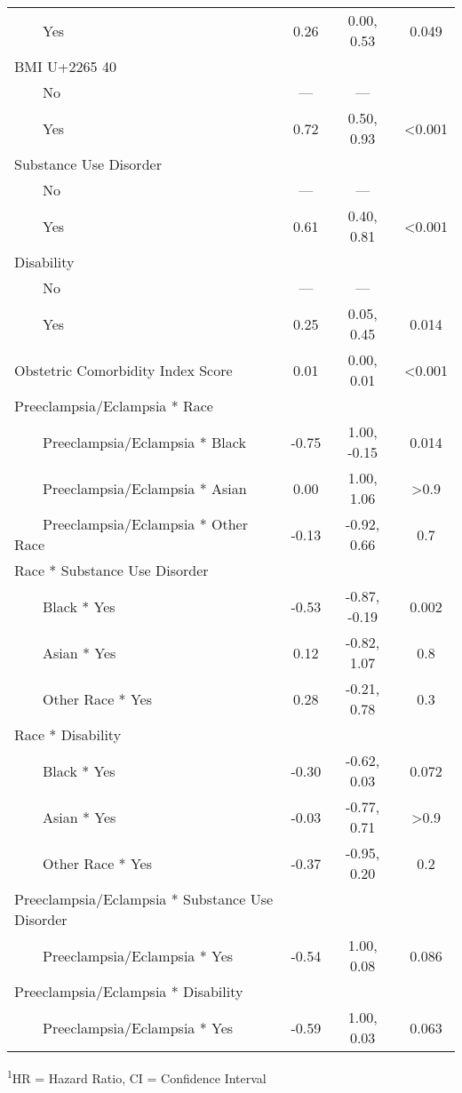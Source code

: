 \begin{longtable}{lccc}
    Yes & 0.26 & 0.00, 0.53 & 0.049 \\ 
BMI U+2265 40 &  &  &  \\ 
    No & — & — &  \\ 
    Yes & 0.72 & 0.50, 0.93 & <0.001 \\ 
Substance Use Disorder &  &  &  \\ 
    No & — & — &  \\ 
    Yes & 0.61 & 0.40, 0.81 & <0.001 \\ 
Disability &  &  &  \\ 
    No & — & — &  \\ 
    Yes & 0.25 & 0.05, 0.45 & 0.014 \\ 
Obstetric Comorbidity Index Score & 0.01 & 0.00, 0.01 & <0.001 \\ 
Preeclampsia/Eclampsia * Race &  &  &  \\ 
    Preeclampsia/Eclampsia * Black & -0.75 & 1.00, -0.15 & 0.014 \\ 
    Preeclampsia/Eclampsia * Asian & 0.00 & 1.00, 1.06 & >0.9 \\ 
    Preeclampsia/Eclampsia * Other Race & -0.13 & -0.92, 0.66 & 0.7 \\ 
Race * Substance Use Disorder &  &  &  \\ 
    Black * Yes & -0.53 & -0.87, -0.19 & 0.002 \\ 
    Asian * Yes & 0.12 & -0.82, 1.07 & 0.8 \\ 
    Other Race * Yes & 0.28 & -0.21, 0.78 & 0.3 \\ 
Race * Disability &  &  &  \\ 
    Black * Yes & -0.30 & -0.62, 0.03 & 0.072 \\ 
    Asian * Yes & -0.03 & -0.77, 0.71 & >0.9 \\ 
    Other Race * Yes & -0.37 & -0.95, 0.20 & 0.2 \\ 
Preeclampsia/Eclampsia * Substance Use Disorder &  &  &  \\ 
    Preeclampsia/Eclampsia * Yes & -0.54 & 1.00, 0.08 & 0.086 \\ 
Preeclampsia/Eclampsia * Disability &  &  &  \\ 
    Preeclampsia/Eclampsia * Yes & -0.59 & 1.00, 0.03 & 0.063 \\ 
\bottomrule
\end{longtable}
\begin{minipage}{\linewidth}
\textsuperscript{1}HR = Hazard Ratio, CI = Confidence Interval\\
\end{minipage}

